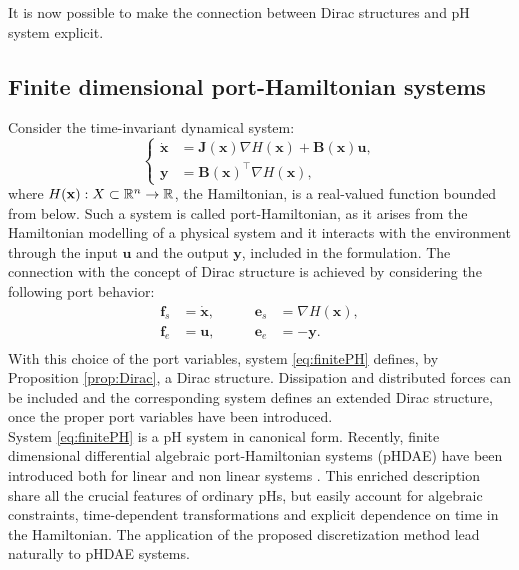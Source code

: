 It is now possible to make the connection between Dirac structures and pH system explicit.

\subsection{Finite dimensional port-Hamiltonian systems}
 Consider the time-invariant dynamical system:
\begin{equation}
\label{eq:finitePH}
\begin{cases}
\dot{ \mathbf{x} } &= \mathbf{J}(\mathbf{x}) \nabla H(\mathbf{x}) + \mathbf{B}(\mathbf{x})\mathbf{u}, \\
\mathbf{y} &= \mathbf{B}(\mathbf{x})^\top \nabla H(\mathbf{x}),
\end{cases}
\end{equation}
where $ H(\mathbf{x}) : X \subset \mathbb{R}^n \rightarrow \mathbb{R} $, the Hamiltonian, is a real-valued function bounded from below. Such a system is called port-Hamiltonian, as it arises from the Hamiltonian modelling of a physical system and it interacts with the environment through the input $\mathbf{u}$ and the output $\mathbf{y}$, included in the formulation. The connection with the concept of Dirac structure is achieved by considering the following port behavior:
\begin{equation}
\begin{aligned}
\mathbf{f}_s &= \dot{\mathbf{x}}, \qquad 
&\mathbf{e}_s &= \nabla{H}(\mathbf{x}), \\
\mathbf{f}_e &=\mathbf{u}, \qquad
&\mathbf{e}_e &= -\mathbf{y}. \\
\end{aligned}
\end{equation}
With this choice of the port variables, system \eqref{eq:finitePH} defines, by Proposition \ref{prop:Dirac}, a Dirac structure. Dissipation and distributed forces can be included and the corresponding system defines an extended Dirac structure, once the proper port variables have been introduced. \\

System \ref{eq:finitePH} is a pH system in canonical form. Recently, finite dimensional differential algebraic port-Hamiltonian systems (pHDAE) have been introduced both for linear \cite{beattie2018linear} and non linear systems \cite{morandin2019}. This enriched description share all the crucial features of ordinary pHs, but easily account for algebraic constraints, time-dependent transformations and explicit dependence on time in the Hamiltonian. The application of the proposed discretization method lead naturally to pHDAE systems. 


